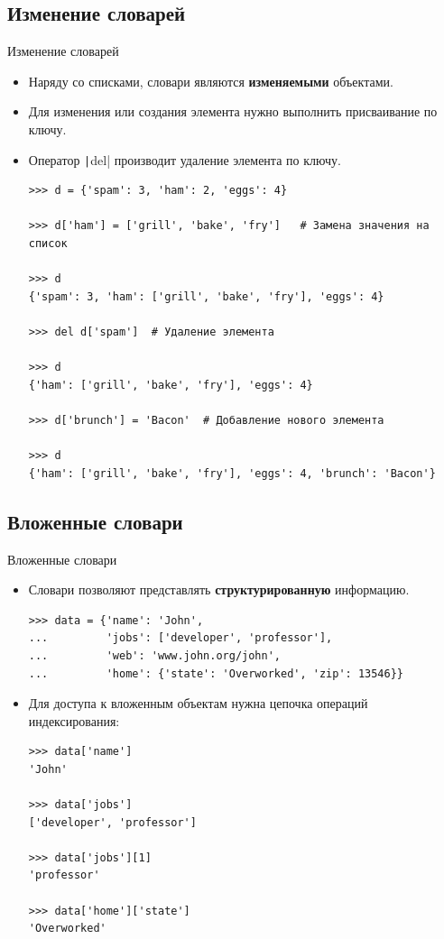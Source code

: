 \documentclass[aspectratio=169, mathserif]{beamer}%
\begin{document}
\subsection{Изменение словарей}
\scriptsize
\begin{frame}[fragile]{Изменение словарей}
\begin{itemize}
\item Наряду со списками, словари являются \textcolor{extraorange}{\textbf{изменяемыми}} объектами.
\item  Для изменения или создания элемента нужно выполнить присваивание по ключу. 
\item Оператор \texttt|del| производит удаление элемента по ключу.

\begin{verbatim}
>>> d = {'spam': 3, 'ham': 2, 'eggs': 4}

>>> d['ham'] = ['grill', 'bake', 'fry']   # Замена значения на список

>>> d
{'spam': 3, 'ham': ['grill', 'bake', 'fry'], 'eggs': 4}

>>> del d['spam']  # Удаление элемента

>>> d
{'ham': ['grill', 'bake', 'fry'], 'eggs': 4}

>>> d['brunch'] = 'Bacon'  # Добавление нового элемента

>>> d
{'ham': ['grill', 'bake', 'fry'], 'eggs': 4, 'brunch': 'Bacon'}
\end{verbatim}
\end{itemize}
\vfill
\end{frame}

\subsection{Вложенные словари}

\begin{frame}[fragile]{Вложенные словари}
\scriptsize
\begin{itemize}
\item Словари позволяют представлять \textcolor{extraorange}{\textbf{структурированную}} информацию.

\begin{verbatim}
>>> data = {'name': 'John',
...         'jobs': ['developer', 'professor'],
...         'web': 'www.john.org/john',
...         'home': {'state': 'Overworked', 'zip': 13546}}
\end{verbatim}
\item Для доступа к вложенным объектам нужна цепочка операций индексирования:

\begin{verbatim}
>>> data['name']
'John'

>>> data['jobs']
['developer', 'professor']

>>> data['jobs'][1]
'professor'

>>> data['home']['state']
'Overworked'
\end{verbatim}
\end{itemize}
\vfill
\end{frame}
\end{document}
